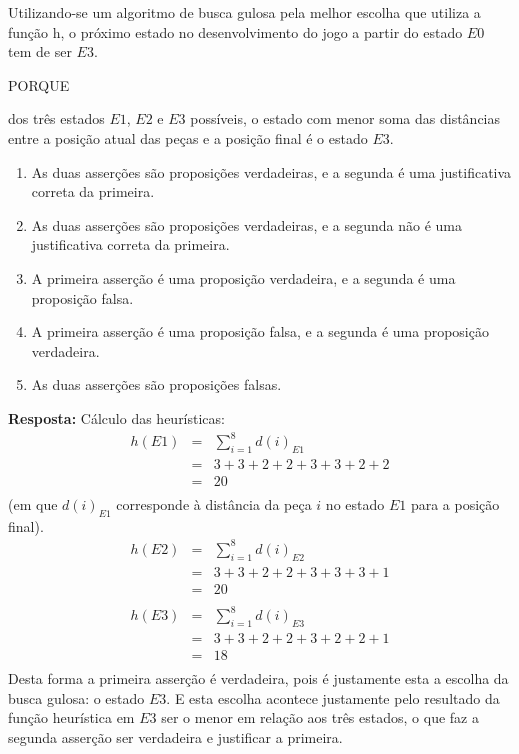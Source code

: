 \documentclass[12pt,a4paper,oneside]{article}
\begin{document}
\begin{enumerate}
		Utilizando-se um algoritmo de busca gulosa pela melhor escolha que utiliza a função h, o próximo estado no desenvolvimento do jogo a partir do estado $E0$ tem de ser $E3$.
		
		\begin{center}
			PORQUE
		\end{center}
		
		dos três estados $E1$, $E2$ e $E3$ possíveis, o estado com menor soma das distâncias entre a posição atual das peças e a posição final é o estado $E3$.
		
		\begin{enumerate}
			\item As duas asserções são proposições verdadeiras, e a segunda é uma justificativa correta da primeira.
			\item As duas asserções são proposições verdadeiras, e a segunda não é uma justificativa correta da primeira.
			\item A primeira asserção é uma proposição verdadeira, e a segunda é uma proposição falsa.
			\item A primeira asserção é uma proposição falsa, e a segunda é uma proposição verdadeira.
			\item As duas asserções são proposições falsas.
		\end{enumerate}
	
		\vspace*{0.3cm}
		
			{\color{blue} 
			{\bf Resposta:} Cálculo das heurísticas:
			\begin{eqnarray*}
				h(E1) 	&=& \sum_{i=1}^{8} d(i)_{E1}\\
				&=& 3+3+2+2+3+3+2+2\\
				&=& 20\\
			\end{eqnarray*}
			(em que $d(i)_{E1}$ corresponde à distância da peça $i$ no estado $E1$ para a posição final).
			\begin{eqnarray*}
				h(E2) 	&=& \sum_{i=1}^{8} d(i)_{E2}\\
				&=& 3+3+2+2+3+3+3+1\\
				&=& 20\\
			\end{eqnarray*}
			\begin{eqnarray*}
				h(E3) 	&=& \sum_{i=1}^{8} d(i)_{E3}\\
				&=& 3+3+2+2+3+2+2+1\\
				&=& 18\\
			\end{eqnarray*}
			Desta forma a primeira asserção é verdadeira, pois é justamente esta a escolha da busca gulosa: o estado $E3$. E esta escolha acontece justamente pelo resultado da função heurística em $E3$ ser o menor em relação aos três estados, o que faz a segunda asserção ser verdadeira e justificar a primeira.
			
}
\end{enumerate}
\end{document}
